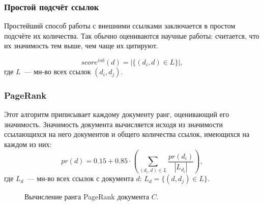 \subsubsection{Простой подсчёт ссылок}
Простейший способ работы с внешними ссылками заключается в простом подсчёте их количества. Так обычно оцениваются научные работы: считается, что их значимость тем выше, чем чаще их цитируют.

\begin{equation}
  score^{inb}(d) = \big|\{(d_i, d)\in L\}\big|,
\end{equation}
где $L$~--- мн-во всех ссылок $(d_i, d_j)$.

\subsubsection{PageRank} \label{sssec:pagerank}
Этот алгоритм приписывает каждому документу ранг, оценивающий его значимость. Значимость документа вычисляется исходя из значимости ссылающихся на него документов и общего количества ссылок, имеющихся на каждом из них:
\begin{equation} \label{eq:pagerank}
  pr(d) = 0.15 + 0.85 \cdot \left(\sum_{(d_i, d)\in L} \frac{pr(d_i)}{|L_{d_i}|}\right),
\end{equation}
где $L_d$~--- мн-во всех ссылок с документа $d$: $L_d = \{(d, d_j)\in L\}$.

\begin{figure}
  \centering
  \caption{Вычисление ранга PageRank документа $C$.}
  \label{fig:pagerank}
\end{figure}

